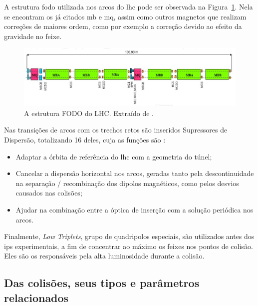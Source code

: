 A estrutura \gls{fodo} utilizada nos arcos do \gls{lhc} pode ser observada na
Figura~\ref{fig:fodo_lhc}. Nela se encontram os já citados \gls{mb} e
\gls{mq}, assim como outros magnetos que realizam correções de maiores ordem,
como por exemplo a correção devido ao efeito da gravidade no feixe. 

\begin{figure}[h!t]
\centering
\includegraphics[width=\textwidth]{imagens/fodo_lhc.jpg}
\caption[A estrutura FODO do LHC.]{A estrutura FODO do LHC. Extraído de \cite{closerLook}.}
\label{fig:fodo_lhc}
\end{figure}

Nas transições de arcos com os trechos retos são inseridos 
Supressores de Dispersão, totalizando 16 deles, cuja as funções são
\cite{lhc_design}:

\begin{itemize}
\item Adaptar a órbita de referência do \gls{lhc} com a geometria do túnel;
\item Cancelar a dispersão horizontal nos arcos, geradas tanto pela descontinuidade na
separação / recombinação dos dipolos magnéticos, como pelos desvios causados nas
colisões;
\item Ajudar na combinação entre a óptica de inserção com a solução periódica nos arcos.
\end{itemize}

Finalmente, \emph{Low Triplets}, grupo de quadripolos especiais, são utilizados antes dos
\glspl{ip} experimentais, a fim de concentrar ao máximo os feixes nos pontos de
colisão. Eles são os responsáveis pela alta luminosidade durante a colisão.


\subsection{Das colisões, seus tipos e parâmetros relacionados}
\label{ssec:lhc_col}

